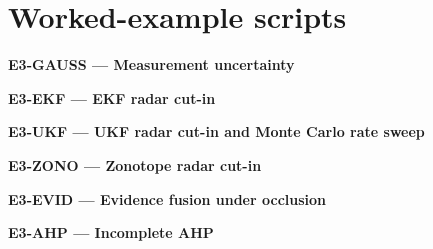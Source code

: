 \section*{Worked-example scripts}

\par\medskip{}\label{code:E3-GAUSS}
\noindent\textbf{E3-GAUSS --- Measurement uncertainty}\par
\noindent{}\par

\par\medskip{}\label{code:E3-EKF}
\noindent\textbf{E3-EKF --- EKF radar cut-in}\par
\noindent{}\par

\par\medskip{}\label{code:E3-UKF}
\noindent\textbf{E3-UKF --- UKF radar cut-in and Monte Carlo rate sweep}\par
\noindent{}\par

\par\medskip{}\label{code:E3-ZONO}
\noindent\textbf{E3-ZONO --- Zonotope radar cut-in}\par
\noindent{}\par

\par\medskip{}\label{code:E3-EVID}
\noindent\textbf{E3-EVID --- Evidence fusion under occlusion}\par
\noindent{}\par

\par\medskip{}\label{code:E3-AHP}
\noindent\textbf{E3-AHP --- Incomplete AHP}\par
\noindent{}\par

